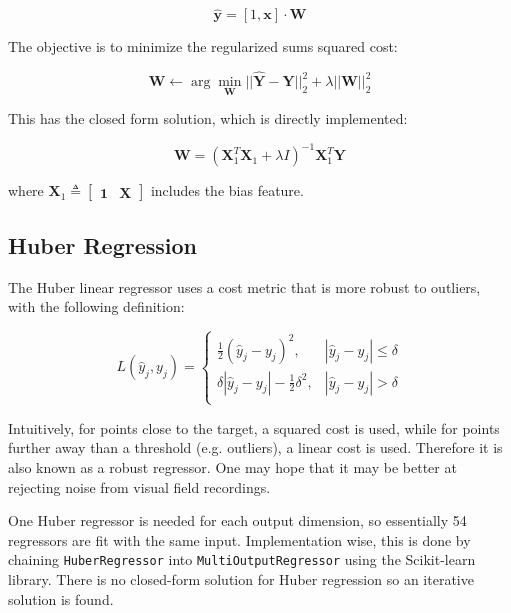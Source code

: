 \begin{equation}
\hat{\mathbf{y}} = [1, \mathbf{x}] \cdot \mathbf{W}
\end{equation}

The objective is to minimize the regularized sums squared cost:

\begin{equation}
\mathbf{W} \leftarrow \arg \min_{\mathbf{W}} ||\hat{\mathbf{Y}} - \mathbf{Y}||^2_2 + \lambda ||\mathbf{W}||^2_2
\end{equation}

This has the closed form solution, which is directly implemented:

\begin{equation}
\mathbf{W} = \left(
\mathbf{X}_1^T \mathbf{X}_1 + \lambda I
\right)^{-1}
\mathbf{X}_1^T \mathbf{Y}
\end{equation}

where $\mathbf{X}_1\triangleq\begin{bmatrix}\mathbf{1} & \mathbf{X} \end{bmatrix}$ includes the bias feature. 

\subsection{Huber Regression}

The Huber linear regressor uses a cost metric that is more robust to outliers, with the following definition:

\begin{equation}
L(\hat{y}_j, y_j) = \left\{\begin{array}{lr}
\frac{1}{2}(\hat{y}_j - y_j)^2, & |\hat{y}_j - y_j| \leq \delta\\
\delta|\hat{y}_j - y_j| - \frac{1}{2} \delta^2, & |\hat{y}_j - y_j| > \delta\\
\end{array}
\right.
\end{equation}

Intuitively, for points close to the target, a squared cost is used, while for points further away than a threshold (e.g. outliers), a linear cost is used. Therefore it is also known as a robust regressor. One may hope that it may be better at rejecting noise from visual field recordings. 

One Huber regressor is needed for each output dimension, so essentially 54 regressors are fit with the same input. Implementation wise, this is done by chaining \verb|HuberRegressor| into \verb|MultiOutputRegressor| using the Scikit-learn library. \cite{scikit-learn} There is no closed-form solution for Huber regression so an iterative solution is found. 

